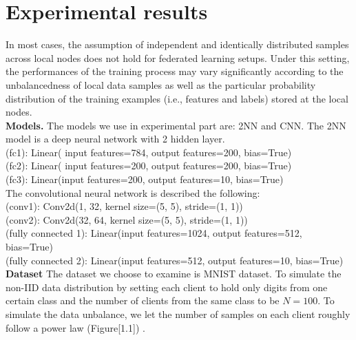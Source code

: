 \documentclass{article}
\theoremstyle{theorem}
\theoremstyle{definition}
\begin{document}
\section{Experimental results}
In most cases, the assumption of independent and identically distributed samples across local nodes does not hold for federated learning setups. Under this setting, the performances of the training process may vary significantly according to the unbalancedness of local data samples as well as the particular probability distribution of the training examples (i.e., features and labels) stored at the local nodes.\\
\textbf{Models.} The models we use in experimental part are: 2NN and CNN.
The 2NN model is a deep neural network with 2 hidden layer.\\
(fc1): Linear( input features=784, output features=200, bias=True)\\
(fc2): Linear( input features=200, output features=200, bias=True)\\
(fc3): Linear(input features=200, output features=10, bias=True)\\
The convolutional neural network is described the following:\\
(conv1): Conv2d(1, 32, kernel size=(5, 5), stride=(1, 1)) \\
(conv2): Conv2d(32, 64, kernel size=(5, 5), stride=(1, 1))\\
(fully connected 1): Linear(input features=1024, output features=512, bias=True)\\
(fully connected 2): Linear(input features=512, output features=10, bias=True)\\
\textbf{Dataset} The dataset we choose to examine is MNIST dataset. To simulate the non-IID data distribution
by setting each client to hold only digits from one certain
class and the number of clients from the same class to be
$N=100.$ To simulate the data unbalance, we let the number of
samples on each client roughly follow a power law (Figure[1.1]) .\\
\end{document}

